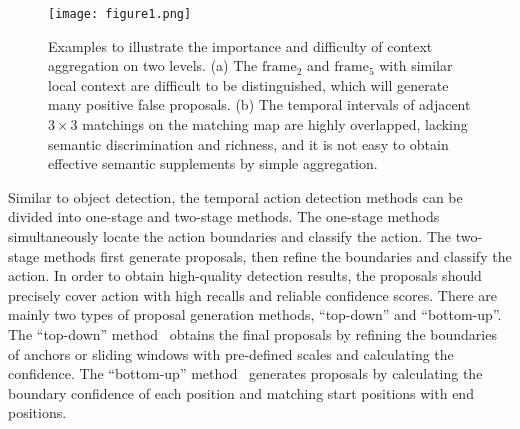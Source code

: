 \documentclass[letterpaper]{article} \usepackage{aaai22}  \usepackage{times}  \usepackage{helvet}  \usepackage{courier}  \usepackage[hyphens]{url}  \usepackage{graphicx} \urlstyle{rm} \def\UrlFont{\rm}  \usepackage{natbib}  \usepackage{caption} \DeclareCaptionStyle{ruled}{labelfont=normalfont,labelsep=colon,strut=off} \frenchspacing  \setlength{\pdfpagewidth}{8.5in}  \setlength{\pdfpageheight}{11in}  \usepackage{algorithm}
\begin{document}
\begin{figure}[!ht]
\centering
\texttt{[image: figure1.png]}
\caption{Examples to illustrate the importance and difficulty of context aggregation on two levels. (a) The $\text{frame}_2$ and $\text{frame}_5$ with similar local context are difficult to be distinguished, which will generate many positive false proposals. (b) The temporal intervals of adjacent $3 \times 3$ matchings on the matching map are highly overlapped, lacking semantic discrimination and richness, and it is not easy to obtain effective semantic supplements by simple aggregation.}


\label{fig:intr}
\end{figure}

Similar to object detection, the temporal action detection methods can be divided into one-stage and two-stage methods. The one-stage methods simultaneously locate the action boundaries and classify the action. The two-stage methods first generate proposals, then refine the boundaries and classify the action. In order to obtain high-quality detection results, the proposals should precisely cover action with high recalls and reliable confidence scores. There are mainly two types of proposal generation methods, ``top-down'' and ``bottom-up''. The ``top-down'' method~\cite{turn,gtan,rapnet,talnet,ssad} obtains the final proposals by refining the boundaries of anchors or sliding windows with pre-defined scales and calculating the confidence. 
The ``bottom-up'' method~\cite{tag,bsn,bmn,bcgnn,bsn++,gtad} generates proposals by calculating the boundary confidence of each position and matching start positions with end positions. 
\end{document}
